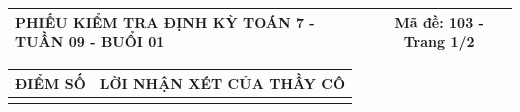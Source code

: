 \documentclass[12pt,a4paper]{article}
\begin{document}
\newpage
\noindent
\begin{tabularx}{\linewidth}{|X|c|}
\hline
\textbf{PHIẾU KIỂM TRA ĐỊNH KỲ TOÁN 7 - TUẦN 09 - BUỔI 01} & \textbf{Mã đề: 103 - Trang 1/2} \\
\hline
\end{tabularx}

\vspace{1.2mm}

\noindent
\begin{tabularx}{\linewidth}{|p{3.2cm}|X|}
\hline
\centering\textbf{ĐIỂM SỐ} & \centering\textbf{LỜI NHẬN XÉT CỦA THẦY CÔ} \tabularnewline
\hline
\rule{0pt}{1.8cm} & \tabularnewline
\hline
\end{tabularx}
\end{document}
